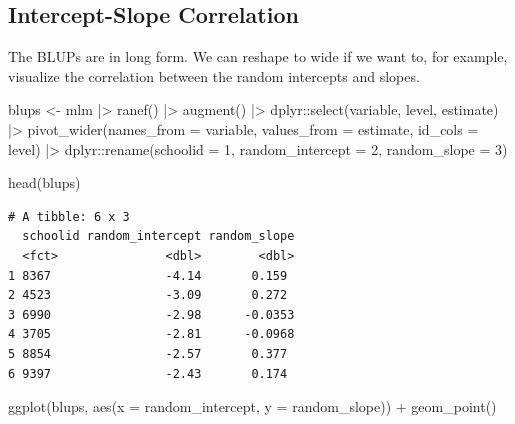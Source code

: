 \documentclass[
  letterpaper,
  DIV=11,
  numbers=noendperiod]{scrreprt}
\newenvironment{Shaded}{\begin{snugshade}}{\end{snugshade}}
\newcommand{\AttributeTok}[1]{\textcolor[rgb]{0.49,0.56,0.16}{#1}}
\newcommand{\DecValTok}[1]{\textcolor[rgb]{0.25,0.63,0.44}{#1}}
\newcommand{\FunctionTok}[1]{\textcolor[rgb]{0.02,0.16,0.49}{#1}}
\newcommand{\NormalTok}[1]{\textcolor[rgb]{0.00,0.44,0.13}{#1}}
\newcommand{\OtherTok}[1]{\textcolor[rgb]{0.00,0.44,0.13}{#1}}
\newcommand{\SpecialCharTok}[1]{\textcolor[rgb]{0.25,0.44,0.63}{#1}}
\begin{document}
\hypertarget{intercept-slope-correlation}{%
\subsection{Intercept-Slope
Correlation}\label{intercept-slope-correlation}}

The BLUPs are in long form. We can reshape to wide if we want to, for
example, visualize the correlation between the random intercepts and
slopes.

\begin{Shaded}
\begin{Highlighting}[]
\NormalTok{blups }\OtherTok{\textless{}{-}}\NormalTok{ mlm }\SpecialCharTok{|\textgreater{}} 
  \FunctionTok{ranef}\NormalTok{() }\SpecialCharTok{|\textgreater{}} 
  \FunctionTok{augment}\NormalTok{() }\SpecialCharTok{|\textgreater{}} 
\NormalTok{  dplyr}\SpecialCharTok{::}\FunctionTok{select}\NormalTok{(variable, level, estimate) }\SpecialCharTok{|\textgreater{}} 
  \FunctionTok{pivot\_wider}\NormalTok{(}\AttributeTok{names\_from =}\NormalTok{ variable, }\AttributeTok{values\_from =}\NormalTok{ estimate,}
              \AttributeTok{id\_cols =}\NormalTok{ level) }\SpecialCharTok{|\textgreater{}} 
\NormalTok{  dplyr}\SpecialCharTok{::}\FunctionTok{rename}\NormalTok{(}\AttributeTok{schoolid =} \DecValTok{1}\NormalTok{, }\AttributeTok{random\_intercept =} \DecValTok{2}\NormalTok{, }\AttributeTok{random\_slope =} \DecValTok{3}\NormalTok{)}

\FunctionTok{head}\NormalTok{(blups)}
\end{Highlighting}
\end{Shaded}

\begin{verbatim}
# A tibble: 6 x 3
  schoolid random_intercept random_slope
  <fct>               <dbl>        <dbl>
1 8367                -4.14       0.159 
2 4523                -3.09       0.272 
3 6990                -2.98      -0.0353
4 3705                -2.81      -0.0968
5 8854                -2.57       0.377 
6 9397                -2.43       0.174 
\end{verbatim}

\begin{Shaded}
\begin{Highlighting}[]
\FunctionTok{ggplot}\NormalTok{(blups, }\FunctionTok{aes}\NormalTok{(}\AttributeTok{x =}\NormalTok{ random\_intercept, }\AttributeTok{y =}\NormalTok{ random\_slope)) }\SpecialCharTok{+}
  \FunctionTok{geom\_point}\NormalTok{()}
\end{Highlighting}
\end{Shaded}
\end{document}
